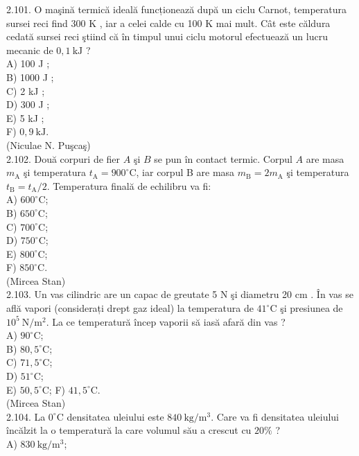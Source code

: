 2.101. O maşină termică ideală funcționează după un ciclu Carnot, temperatura sursei reci find 300 K , iar a celei calde cu 100 K mai mult. Cât este căldura cedată sursei reci ştiind că în timpul unui ciclu motorul efectuează un lucru mecanic de $0,1 \mathrm{~kJ}$ ?\\
A) 100 J ;\\
B) 1000 J ;\\
C) 2 kJ ;\\
D) 300 J ;\\
E) 5 kJ ;\\
F) $0,9 \mathrm{~kJ}$.\\
(Niculae N. Puşcaş)\\
2.102. Două corpuri de fier $A$ şi $B$ se pun în contact termic. Corpul $A$ are masa $m_{\mathrm{A}}$ şi temperatura $t_{\mathrm{A}}=900^{\circ} \mathrm{C}$, iar corpul B are masa $m_{\mathrm{B}}=2 m_{\mathrm{A}}$ şi temperatura $t_{\mathrm{B}}=t_{\mathrm{A}} / 2$. Temperatura finală de echilibru va fi:\\
A) $600^{\circ} \mathrm{C}$;\\
B) $650^{\circ} \mathrm{C}$;\\
C) $700^{\circ} \mathrm{C}$;\\
D) $750^{\circ} \mathrm{C}$;\\
E) $800^{\circ} \mathrm{C}$;\\
F) $850^{\circ} \mathrm{C}$.\\
(Mircea Stan)\\
2.103. Un vas cilindric are un capac de greutate 5 N şi diametru 20 cm . În vas se află vapori (considerați drept gaz ideal) la temperatura de $41^{\circ} \mathrm{C}$ şi presiunea de $10^{5} \mathrm{~N} / \mathrm{m}^{2}$. La ce temperatură încep vaporii să iasă afară din vas ?\\
A) $90^{\circ} \mathrm{C}$;\\
B) $80,5^{\circ} \mathrm{C}$;\\
C) $71,5^{\circ} \mathrm{C}$;\\
D) $51^{\circ} \mathrm{C}$;\\
E) $50,5^{\circ} \mathrm{C}$; F) $41,5^{\circ} \mathrm{C}$.\\
(Mircea Stan)\\
2.104. La $0^{\circ} \mathrm{C}$ densitatea uleiului este $840 \mathrm{~kg} / \mathrm{m}^{3}$. Care va fi densitatea uleiului încălzit la o temperatură la care volumul său a crescut cu $20 \%$ ?\\
A) $830 \mathrm{~kg} / \mathrm{m}^{3}$;\\
